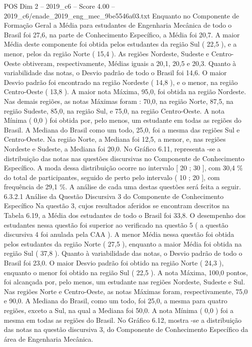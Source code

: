 \begin{textsample}{POS Dim 2 – 2019\_c6 – Score 4.00 – 2019\_c6/enade\_2019\_eng\_mec\_9be5546a03.txt}
Enquanto no Componente de Formação Geral a Média para estudantes de Engenharia Mecânica de todo o Brasil foi 27,6, na parte de Conhecimento Específico, a Média foi 20,7.
A maior Média deste componente foi obtida pelos estudantes da região Sul ( 22,5 ), e a menor, pelos da região Norte ( 15,4 ).
As regiões Nordeste, Sudeste e Centro-Oeste obtiveram, respectivamente, Médias iguais a 20,1, 20,5 e 20,3.
Quanto à variabilidade das notas, o Desvio padrão de todo o Brasil foi 14,6.
O maior Desvio padrão foi encontrado na região Nordeste ( 14,8 ), e o menor, na região Centro-Oeste ( 13,8 ).
A maior nota Máxima, 95,0, foi obtida na região Nordeste.
Nas demais regiões, as notas Máximas foram : 70,0, na região Norte, 87,5, na região Sudeste, 85,0, na região Sul, e 75,0, na região Centro-Oeste.
A nota Mínima ( 0,0 ) foi obtida por, pelo menos, um estudante em todas as regiões do Brasil.
A Mediana do Brasil como um todo, 25,0, foi a mesma das regiões Sul e Centro-Oeste.
Na região Norte, a Mediana foi 12,5, a menor, e, nas regiões Nordeste e Sudeste, a Mediana foi 20,0.
No Gráfico 6.11, representa -se a distribuição das notas nas questões discursivas no Componente de Conhecimento Específico.
A moda dessa distribuição ocorre no intervalo [ 20 ; 30 ], com 30,4 \% do total de participantes, seguido de perto pelo intervalo ( 10 ; 20 ], com frequência de 29,1 \%.
A análise de cada uma destas questões será feita a seguir. 6.3.2.1 Análise da Questão Discursiva 3 do Componente de Conhecimento Específico Na questão 3, cujos resultados aferidos se encontram descritos na Tabela 6.19, a Média dos estudantes de todo o Brasil foi 33,8.
O desempenho dos estudantes nessa questão foi superior ao verificado na questão 5 ( a questão discursiva 4 foi anulada pela CAA ).
A menor Média nessa questão foi obtida pelos estudantes da região Norte ( 27,5 ), enquanto a maior Média foi obtida na região Sul ( 37,8 ).
Quanto à variabilidade das notas, o Desvio padrão de todo o Brasil foi 23,0.
O maior Desvio padrão foi obtido na região Norte ( 24,3 ), enquanto o menor foi obtido na região Sul ( 22,5 ).
A nota Máxima, 100,0 pontos, foi alcançada por, pelo menos, um estudante nas regiões Nordeste, Sudeste e Sul.
Nas regiões Norte e Centro-Oeste, as notas Máximas foram, respectivamente, 75,0 e 90,0.
A Mediana do Brasil, como um todo, foi 25,0, a mesma para quatro regiões, exceto a Sul, na qual a Mediana foi 50,0.
A nota Mínima ( 0,0 ) foi a mesma em todas as regiões do Brasil.
No Gráfico 6.12, mostra -se a distribuição das notas na questão discursiva 3, do Componente de Conhecimento Específico da área de Engenharia Mecânica.

\end{textsample}
